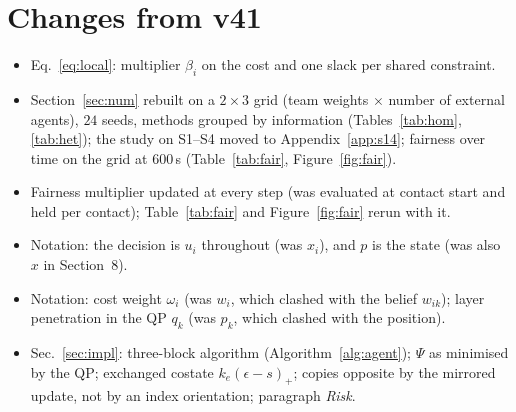 \documentclass[11pt]{article}
\theoremstyle{definition}
\theoremstyle{remark}
\begin{document}
\section*{Changes from v41}
\begin{itemize}
\item Eq.~\eqref{eq:local}: multiplier $\beta_i$ on the cost and one slack per shared constraint.
\item Section~\ref{sec:num} rebuilt on a $2\times3$ grid (team weights $\times$ number of external agents), $24$ seeds, methods grouped by information (Tables~\ref{tab:hom}, \ref{tab:het}); the study on S1--S4 moved to Appendix~\ref{app:s14}; fairness over time on the grid at $600$\,s (Table~\ref{tab:fair}, Figure~\ref{fig:fair}).
\item Fairness multiplier updated at every step (was evaluated at contact start and held per contact); Table~\ref{tab:fair} and Figure~\ref{fig:fair} rerun with it.
\item Notation: the decision is $u_i$ throughout (was $x_i$), and $p$ is the state (was also $x$ in Section~8).
\item Notation: cost weight $\omega_i$ (was $w_i$, which clashed with the belief $w_{ik}$); layer penetration in the QP $q_k$ (was $p_k$, which clashed with the position).
\item Sec.~\ref{sec:impl}: three-block algorithm (Algorithm~\ref{alg:agent}); $\Psi$ as minimised by the QP; exchanged costate $k_e(\epsilon-s)_+$; copies opposite by the mirrored update, not by an index orientation; paragraph \emph{Risk}.
\end{itemize}
\end{document}
